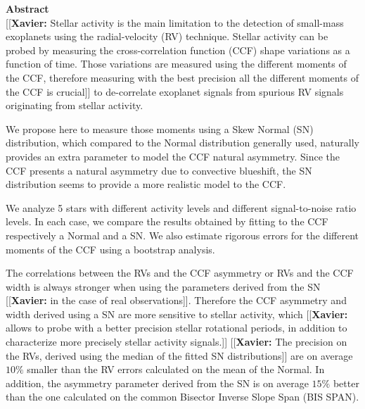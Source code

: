 \documentclass[11pt, oneside]{article}
\title{\xavier{Measuring precise radia velocities and cross-correlation function line-profile variations using a Skew Normal distribution}}
\author{U. Simola
	    \and X. Dumusque
	    \and Jessi Cisewski-Kehe
	    }
\newcommand{\xavier}[1]{{\color{blue}[[\textbf{Xavier: }#1]]}}
\begin{document}
\maketitle

{\bf Abstract}\\
\xavier{Stellar activity is the main limitation to the detection of small-mass exoplanets using the radial-velocity (RV) technique. Stellar activity can be probed by measuring the cross-correlation function (CCF) shape variations as a function of time. Those variations are measured using the different moments of the CCF, therefore measuring with the best precision all the different moments of the CCF is crucial} to de-correlate exoplanet signals from spurious RV signals originating from stellar activity.

We propose here to measure those moments using a Skew Normal (SN) distribution, which compared to the Normal distribution generally used, naturally provides an extra parameter to model the CCF natural asymmetry. Since the CCF presents a natural asymmetry due to convective blueshift, the SN distribution seems to provide a more realistic model to the CCF.

We analyze 5 stars with different activity levels and different signal-to-noise ratio levels. In each case, we compare the results obtained by fitting to the CCF respectively a Normal and a SN.  We also estimate rigorous errors for the different moments of the CCF using a bootstrap analysis.

The correlations between the RVs and the CCF asymmetry or RVs and the CCF width is always stronger when using the parameters derived from the SN \xavier{in the case of real observations}. Therefore the CCF asymmetry and width derived using a SN are more sensitive to stellar activity, which \xavier{allows to probe with a better precision stellar rotational periods, in addition to characterize more precisely stellar activity signals.}
\xavier{The precision on the RVs, derived using the median of the fitted SN distributions} are on average $10\%$ smaller than the RV errors calculated on the mean of the Normal. In addition, the asymmetry parameter derived from the SN is on average $15\%$ better than the one calculated on the common Bisector Inverse Slope Span (BIS SPAN).
\end{document}
